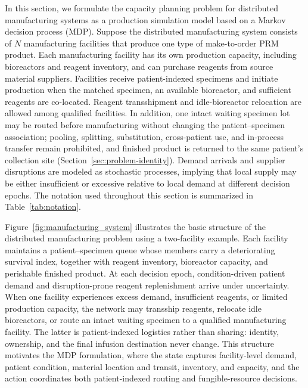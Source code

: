 \documentclass[preprint,review,12pt]{elsarticle}
\begin{document}
In this section, we formulate the capacity planning problem for distributed manufacturing systems as a production simulation model based on a Markov decision process (MDP). Suppose the distributed manufacturing system consists of $N$ manufacturing facilities that produce one type of make-to-order PRM product. Each manufacturing facility has its own production capacity, including bioreactors and reagent inventory, and can purchase reagents from source material suppliers. Facilities receive patient-indexed specimens and initiate production when the matched specimen, an available bioreactor, and sufficient reagents are co-located. Reagent transshipment and idle-bioreactor relocation are allowed among qualified facilities. In addition, one intact waiting specimen lot may be routed before manufacturing without changing the patient--specimen association; pooling, splitting, substitution, cross-patient use, and in-process transfer remain prohibited, and finished product is returned to the same patient's collection site (Section~\ref{sec:problem-identity}). Demand arrivals and supplier disruptions are modeled as stochastic processes, implying that local supply may be either insufficient or excessive relative to local demand at different decision epochs. The notation used throughout this section is summarized in Table~\ref{tab:notation}.

Figure~\ref{fig:manufacturing_system} illustrates the basic structure of the distributed manufacturing problem using a two-facility example. Each facility maintains a patient--specimen queue whose members carry a deteriorating survival index, together with reagent inventory, bioreactor capacity, and perishable finished product. At each decision epoch, condition-driven patient demand and disruption-prone reagent replenishment arrive under uncertainty. When one facility experiences excess demand, insufficient reagents, or limited production capacity, the network may transship reagents, relocate idle bioreactors, or route an intact waiting specimen to a qualified manufacturing facility. The latter is patient-indexed logistics rather than sharing: identity, ownership, and the final infusion destination never change. This structure motivates the MDP formulation, where the state captures facility-level demand, patient condition, material location and transit, inventory, and capacity, and the action coordinates both patient-indexed routing and fungible-resource decisions.
\end{document}
